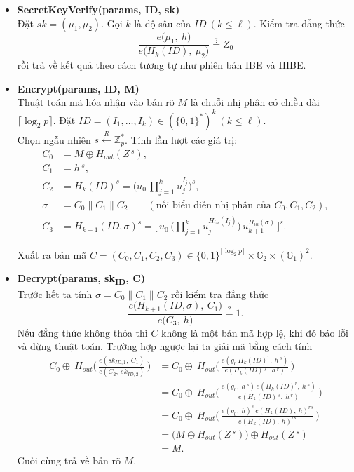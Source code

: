 \documentclass[class=report, crop=false]{standalone}
\begin{document}
\begin{itemize}[leftmargin=1cm, itemindent=-1cm]
			\item[] {\sffamily\bfseries SecretKeyVerify(params, ID, sk)} \\
			Đặt $sk = (\mu_1, \mu_2)$. Gọi $k$ là độ sâu của $ID \ (k \leq \ell)$. Kiểm tra đẳng thức
			\[
				\frac{e \Big(\mu_1,\ h \Big)}{e \Big(H_{k}(ID),\ \mu_2 \Big)} \overset{?}{=} Z_0
			\]
			rồi trả về kết quả theo cách tương tự như phiên bản IBE và HIBE.
			\item[] {\sffamily\bfseries Encrypt(params, ID, M)} \\
			Thuật toán mã hóa nhận vào bản rõ $M$ là chuỗi nhị phân có chiều dài $\lceil \log_2 p \rceil$. Đặt $ID = (I_1, \dots, I_k) \in (\{0, 1 \}^*)^k \ (k \leq \ell)$. \\
			Chọn ngẫu nhiên $s \xleftarrow{R} \mathbb{Z}_p^*$. Tính lần lượt các giá trị:
			\begin{align*}
				C_0 	&= M \oplus H_{out}(Z\,^s), \\
				C_1 	&= h\,^s, \\
				C_2 	&= H_{k}(ID)^s = \Big(u_0 \, \prod_{j = 1}^k u_j^{I_j} \Big)^s, \\
				\sigma 	&= C_0 \parallel C_1 \parallel C_2 \quad\quad (\text{nối biểu diễn nhị phân của } C_0, C_1, C_2), \\
				C_3 	&= H_{k + 1}(ID, \sigma)^s = \bigg[\, u_0 \, \Big(\prod_{j = 1}^k u_j^{H_{in}(I_j)} \Big)\, u_{k + 1}^{H_{in}(\sigma)} \, \bigg]^s.
			\end{align*}
			
			Xuất ra bản mã $C = (C_0, C_1, C_2, C_3) \in \{0, 1 \}^{\lceil \log_2 p \rceil} \times \mathbb{G}_2 \times (\mathbb{G}_1)^2$.
			\item[] {\sffamily\bfseries Decrypt(params, sk\textsubscript{ID}, C)} \\
			Trước hết ta tính $\sigma = C_0 \parallel C_1 \parallel C_2$ rồi kiểm tra đẳng thức
			\[
				\frac{e \Big(H_{k + 1}(ID, \sigma),\ C_1 \Big)}{e \Big(C_3,\ h \Big)} \overset{?}{=} 1.
			\]
			Nếu đẳng thức không thỏa thì $C$ không là một bản mã hợp lệ, khi đó báo lỗi và dừng thuật toán. Trường hợp ngược lại ta giải mã bằng cách tính
			\begin{align*}
				C_0 \oplus\ H_{out}\Bigg(\, \frac{e (sk_{ID, 1},\ C_1)}{e (C_2,\ sk_{ID, 2})}\, \Bigg) &=
				C_0 \oplus\ H_{out}\Bigg(\, \frac{e (g_0\, H_{k}(ID)^r,\ h\,^s)}{e (H_{k}(ID)\,^s,\ h\,^r)}\, \Bigg) \\ &=
				C_0 \oplus\ H_{out}\Bigg(\, \frac{e (g_0,\ h\,^s)\, e (H_{k}(ID)^r,\ h\,^s)}{e (H_{k}(ID)\,^s,\ h\,^r)}\, \Bigg) \\ &=
				C_0 \oplus\ H_{out}\Bigg(\, \frac{e (g_0,\ h)^s\, e (H_{k}(ID),\ h)^{rs}}{e (H_{k}(ID),\ h)^{rs}}\, \Bigg) \\ &=
				\Big(M \oplus H_{out}(Z\,^s) \Big) \oplus H_{out}(Z\,^s) \\
				&= M.
			\end{align*}
			Cuối cùng trả về bản rõ $M$.
		\end{itemize}
\end{document}
